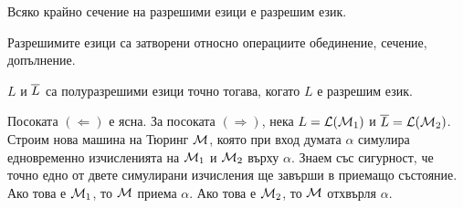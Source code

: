 \begin{cor}
  Всяко крайно сечение на разрешими езици е разрешим език.
\end{cor}

\begin{framed}
  \begin{thm}
    Разрешимите езици са затворени относно операциите обединение, сечение, допълнение.
  \end{thm}
\end{framed}


\begin{framed}
  \begin{thm}
    $L$ и $\overline{L}$ са полуразрешими езици точно тогава, когато $L$ е разрешим език.
  \end{thm}
\end{framed}
\begin{hint}
  Посоката $(\Leftarrow)$ е ясна.
  За посоката $(\Rightarrow)$, нека $L = \mathcal{L}(\mathcal{M}_1)$ и $\overline{L} = \mathcal{L}(\mathcal{M}_2)$.
  Строим нова машина на Тюринг $\mathcal{M}$, която при вход думата $\alpha$ симулира едновременно изчисленията на $\mathcal{M}_1$ и $\mathcal{M}_2$ върху $\alpha$.
  Знаем със сигурност, че точно едно от двете симулирани изчисления ще завърши в приемащо състояние.
  Ако това е $\mathcal{M}_1$, то $\mathcal{M}$ приема $\alpha$.
  Ако това е $\mathcal{M}_2$, то $\mathcal{M}$ отхвърля $\alpha$.
\end{hint}


